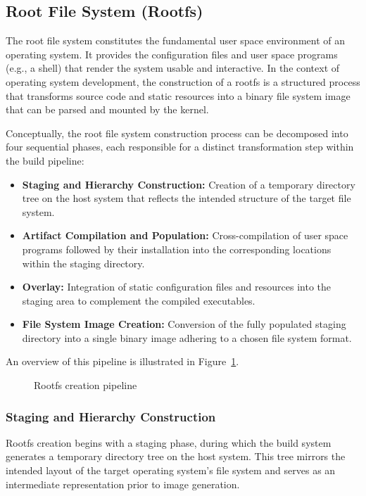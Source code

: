 \documentclass[a4paper,10pt,twoside]{report}
\theoremstyle{definition}
\begin{document}
\subsection{Root File System (Rootfs)}
\label{subsec:rootfs}

The root file system constitutes the fundamental user space environment of an operating system. It provides the configuration files and user space programs (e.g., a shell) that render the system usable and interactive. In the context of operating system development, the construction of a rootfs is a structured process that transforms source code and static resources into a binary file system image that can be parsed and mounted by the kernel.

Conceptually, the root file system construction process can be decomposed into four sequential phases, each responsible for a distinct transformation step within the build pipeline:
\begin{itemize}
    \item \textbf{Staging and Hierarchy Construction:} Creation of a temporary directory tree on the host system that reflects the intended structure of the target file system.
    \item \textbf{Artifact Compilation and Population:} Cross-compilation of user space programs followed by their installation into the corresponding locations within the staging directory.
    \item \textbf{Overlay:} Integration of static configuration files and resources into the staging area to complement the compiled executables.
    \item \textbf{File System Image Creation:} Conversion of the fully populated staging directory into a single binary image adhering to a chosen file system format.
\end{itemize}
An overview of this pipeline is illustrated in Figure~\ref{fig:rootfs_pipeline}.

\begin{figure}[htbp]
    \centering
    
    \caption{Rootfs creation pipeline}
    \label{fig:rootfs_pipeline}
\end{figure}

\subsubsection{Staging and Hierarchy Construction}

Rootfs creation begins with a staging phase, during which the build system generates a temporary directory tree on the host system. This tree mirrors the intended layout of the target operating system's file system and serves as an intermediate representation prior to image generation.
\end{document}
